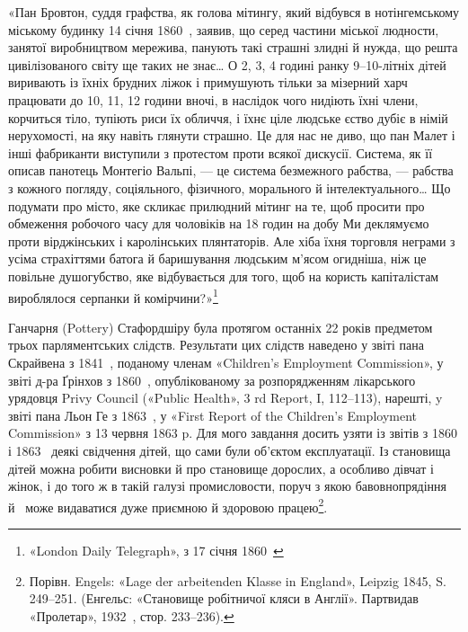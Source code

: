 «Пан Бровтон, суддя графства, як голова мітингу, який
відбувся в нотінгемському міському будинку 14 січня 1860~,
заявив, що серед частини міської людности, занятої виробництвом
мережива, панують такі страшні злидні й нужда, що решта цивілізованого
світу ще таких не знає\dots{} О 2, 3, 4 годині ранку 9--10-літніх
дітей виривають із їхніх брудних ліжок і примушують
тільки за мізерний харч працювати до 10, 11, 12 години вночі,
в наслідок чого нидіють їхні члени, корчиться тіло, тупіють риси
їх обличчя, і їхнє ціле людське єство дубіє в німій нерухомості, на
яку навіть глянути страшно. Це для нас не диво, що пан Малет
і інші фабриканти виступили з протестом проти всякої дискусії.
Система, як її описав панотець Монтегіо Вальпі, — це система безмежного
рабства, — рабства з кожного погляду, соціяльного, фізичного,
морального й інтелектуального\dots{} Що подумати про місто,
яке скликає прилюдний мітинг на те, щоб просити про обмеження
робочого часу для чоловіків на 18 годин на добу Ми деклямуємо
проти вірджінських і каролінських плянтаторів. Але хіба їхня
торговля неграми з усіма страхіттями батога й баришування людським
м’ясом огидніша, ніж це повільне душогубство, яке відбувається
для того, щоб на користь капіталістам вироблялося
серпанки й комірчини?»\footnote{
«London Daily Telegraph», з 17 січня 1860~
}

Ганчарня (Pottery) Стафордшіру була протягом останніх
22 років предметом трьох парляментських слідств. Результати
цих слідств наведено у звіті пана Скрайвена з 1841~, поданому
членам «Children’s Employment Commission», у звіті д-ра
Ґрінхов з 1860~, опублікованому за розпорядженням лікарського
урядовця Privy Council («Public Health», 3 rd Report,
I, 112--113), нарешті, y звіті пана Льон Ге з 1863~, у «First
Report of the Children’s Employment Commission» з 13 червня
1863 p. Для мого завдання досить узяти із звітів з 1860 і 1863~
деякі свідчення дітей, що сами були об’єктом експлуатації. Із
становища дітей можна робити висновки й про становище дорослих,
а особливо дівчат і жінок, і до того ж в такій галузі промисловости,
поруч з якою бавовнопрядіння й~ може видаватися
дуже приємною й здоровою працею\footnote{
Порівн. Engels: «Lage der arbeitenden Klasse in England»,
Leipzig 1845, S. 249--251. (Енгельс: «Становище робітничої кляси в
Англії». Партвидав «Пролетар», 1932~, стор. 233--236).
}.

